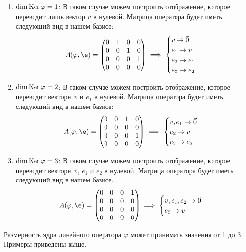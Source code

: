 \begin{enumerate}
    \item $\dim \operatorname{Ker} \varphi = 1$:{
          В таком случае можем построить отображение, которое переводит лишь вектор $v$ в нулевой. Матрица оператора будет иметь следующий вид в нашем базисе:
          \[
              A(\varphi, \e) =
              \begin{pmatrix}
                  0 & 1 & 0 & 0 \\
                  0 & 0 & 1 & 0 \\
                  0 & 0 & 0 & 1 \\
                  0 & 0 & 0 & 0
              \end{pmatrix}
              \implies
              \begin{cases}
                  v \to \vec{0} \\
                  e_1 \to v     \\
                  e_2 \to e_1   \\
                  e_3 \to e_2
              \end{cases}
          \]
          }

    \item $\dim \operatorname{Ker} \varphi = 2$:{
          В таком случае можем построить отображение, которое переводит векторы $v$ и $e_1$ в нулевой. Матрица оператора будет иметь следующий вид в нашем базисе:
          \[
              A(\varphi, \e) =
              \begin{pmatrix}
                  0 & 0 & 1 & 0 \\
                  0 & 0 & 0 & 0 \\
                  0 & 0 & 0 & 1 \\
                  0 & 0 & 0 & 0
              \end{pmatrix}
              \implies
              \begin{cases}
                  v, e_1 \to \vec{0} \\
                  e_2 \to v          \\
                  e_3 \to e_2
              \end{cases}
          \]
          }

    \item $\dim \operatorname{Ker} \varphi = 3$:{
          В таком случае можем построить отображение, которое переводит векторы $v$, $e_1$ и $e_2$ в нулевой. Матрица оператора будет иметь следующий вид в нашем базисе:
          \[
              A(\varphi, \e) =
              \begin{pmatrix}
                  0 & 0 & 0 & 1 \\
                  0 & 0 & 0 & 0 \\
                  0 & 0 & 0 & 0 \\
                  0 & 0 & 0 & 0
              \end{pmatrix}
              \implies
              \begin{cases}
                  v, e_1, e_2 \to \vec{0} \\
                  e_3 \to v
              \end{cases}
          \]
          }
\end{enumerate}

Размерность ядра линейного оператора $\varphi$ может принимать значения от 1 до 3. Примеры приведены выше.

